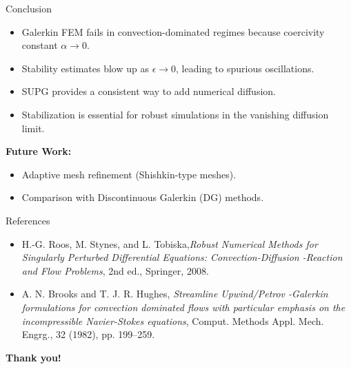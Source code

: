 \documentclass{beamer}
\begin{document}
\begin{frame}{Conclusion}
    \begin{itemize}
        \item Galerkin FEM fails in convection-dominated regimes because coercivity constant $\alpha \to 0$. \pause
        \item Stability estimates blow up as $\epsilon \to 0$, leading to spurious oscillations. \pause
        \item SUPG provides a consistent way to add numerical diffusion. \pause
        \item Stabilization is essential for robust simulations in the vanishing diffusion limit. \pause
    \end{itemize}
    \vfill
    \textbf{Future Work:}
    \begin{itemize}
        \item Adaptive mesh refinement (Shishkin-type meshes).
        \item Comparison with Discontinuous Galerkin (DG) methods.
    \end{itemize}

\end{frame}
\begin{frame}{References}
    \begin{itemize}
        \item H.-G. Roos, M. Stynes, and L. Tobiska,\textit{Robust Numerical Methods for Singularly Perturbed Differential Equations: Convection-Diffusion -Reaction and Flow Problems}, 2nd ed., Springer, 2008.
        \vfill
        \item A. N. Brooks and T. J. R. Hughes, \textit{Streamline Upwind/Petrov -Galerkin formulations for convection dominated flows with particular emphasis on the incompressible Navier-Stokes equations}, Comput. Methods Appl. Mech. Engrg., 32 (1982), pp. 199--259.
    \end{itemize}
    \centering \vfill
    \textbf{Thank you!}
\end{frame}
\end{document}

